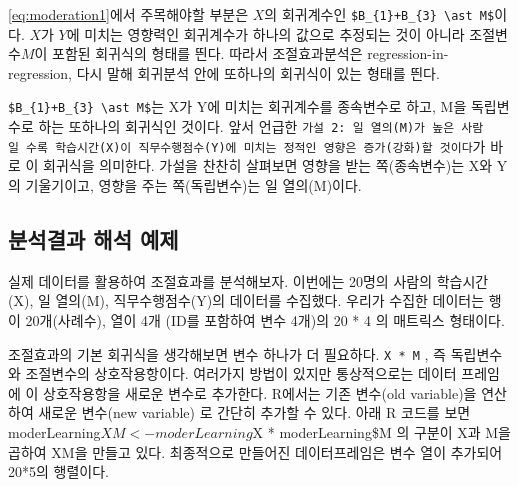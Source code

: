 \documentclass[
]{book}
\begin{document}
\eqref{eq:moderation1}에서 주목해야할 부분은 \(X\)의 회귀계수인 \texttt{\$B\_\{1\}+B\_\{3\}\ \textbackslash{}ast\ M\$}이다. \(X\)가 \(Y\)에 미치는 영향력인 회귀계수가 하나의 값으로 추정되는 것이 아니라 조절변수\(M\)이 포함된 회귀식의 형태를 띈다. 따라서 조절효과분석은 regression-in-regression, 다시 말해 회귀분석 안에 또하나의 회귀식이 있는 형태를 띈다.

\texttt{\$B\_\{1\}+B\_\{3\}\ \textbackslash{}ast\ M\$}는 X가 Y에 미치는 회귀계수를 종속변수로 하고, M을 독립변수로 하는 또하나의 회귀식인 것이다. 앞서 언급한 \texttt{가설\ 2:\ 일\ 열의(M)가\ 높은\ 사람일\ 수록\ 학습시간(X)이\ 직무수행점수(Y)에\ 미치는\ 정적인\ 영향은\ 증가(강화)할\ 것이다}가 바로 이 회귀식을 의미한다. 가설을 찬찬히 살펴보면 영향을 받는 쪽(종속변수)는 X와 Y의 기울기이고, 영향을 주는 쪽(독립변수)는 일 열의(M)이다.

\subsection{분석결과 해석 예제}\label{uxbd84uxc11duxacb0uxacfc-uxd574uxc11d-uxc608uxc81c}

실제 데이터를 활용하여 조절효과를 분석해보자. 이번에는 20명의 사람의 학습시간(X), 일 열의(M), 직무수행점수(Y)의 데이터를 수집했다. 우리가 수집한 데이터는 행이 20개(사례수), 열이 4개 (ID를 포함하여 변수 4개)의 20 * 4 의 매트릭스 형태이다.

조절효과의 기본 회귀식을 생각해보면 변수 하나가 더 필요하다. \texttt{X\ *\ M} , 즉 독립변수와 조절변수의 상호작용항이다. 여러가지 방법이 있지만 통상적으로는 데이터 프레임에 이 상호작용항을 새로운 변수로 추가한다. R에서는 기존 변수(old variable)을 연산하여 새로운 변수(new variable) 로 간단히 추가할 수 있다. 아래 R 코드를 보면 moderLearning\(XM <-moderLearning\)X * moderLearning\$M 의 구분이 X과 M을 곱하여 XM을 만들고 있다. 최종적으로 만들어진 데이터프레임은 변수 열이 추가되어 20*5의 행렬이다.
\end{document}

